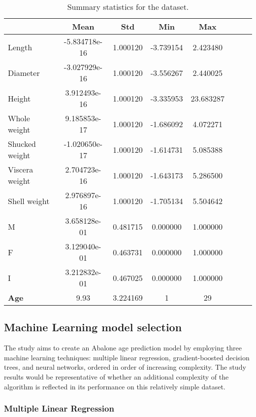 \documentclass[12pt]{article}
\begin{document}
\begin{table}[h]
	\centering
	\begin{tabular}{lccccccc}
		\toprule
		               & Mean          & Std      & Min       & Max       \\
		\midrule
		Length         & -5.834718e-16 & 1.000120 & -3.739154 & 2.423480  \\
		Diameter       & -3.027929e-16 & 1.000120 & -3.556267 & 2.440025  \\
		Height         & 3.912493e-16  & 1.000120 & -3.335953 & 23.683287 \\
		Whole weight   & 9.185853e-17  & 1.000120 & -1.686092 & 4.072271  \\
		Shucked weight & -1.020650e-17 & 1.000120 & -1.614731 & 5.085388  \\
		Viscera weight & 2.704723e-16  & 1.000120 & -1.643173 & 5.286500  \\
		Shell weight   & 2.976897e-16  & 1.000120 & -1.705134 & 5.504642  \\
		M              & 3.658128e-01  & 0.481715 & 0.000000  & 1.000000  \\
		F              & 3.129040e-01  & 0.463731 & 0.000000  & 1.000000  \\
		I              & 3.212832e-01  & 0.467025 & 0.000000  & 1.000000  \\
		\textbf{Age}   & 9.93          & 3.224169 & 1         & 29        \\
		\bottomrule
	\end{tabular}
	\caption{Summary statistics for the dataset.}
	\label{tab:summary}
\end{table}

\subsection{Machine Learning model selection}

The study aims to create an Abalone age prediction model by employing three machine learning techniques: multiple linear regression, gradient-boosted decision trees, and neural networks, ordered in order of increasing complexity. The study results would be representative of whether an additional complexity of the algorithm is reflected in its performance on this relatively simple dataset.

\subsubsection{Multiple Linear Regression}
\end{document}
